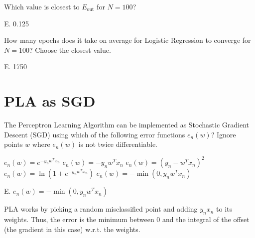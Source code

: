 \documentclass[answers]{exam}
\begin{document}
\begin{questions}
\setcounter{question}{7}

\question Which value is closest to \( E_{\text{out}} \) for \( N = 100 \)?

\begin{choices}
\end{choices}

\begin{solution}
E. 0.125
\end{solution}

\question How many epochs does it take on average for Logistic Regression to converge 
for \( N = 100 \)? Choose the closest value.

\begin{choices}
\end{choices}

\begin{solution}
E. 1750 
\end{solution}

\end{questions}

\section*{PLA as SGD}

\begin{questions}
\setcounter{question}{9}

\question The Perceptron Learning Algorithm can be implemented as Stochastic 
Gradient Descent (SGD) using which of the following error functions \( e_n(w) \)? 
Ignore points \( w \) where \( e_n(w) \) is not twice differentiable.

\begin{choices}
    \choice \( e_n(w) = e^{-y_n w^T x_n} \)
    \choice \( e_n(w) = -y_n w^T x_n \)
    \choice \( e_n(w) = (y_n - w^T x_n)^2 \)
    \choice \( e_n(w) = \ln(1 + e^{-y_n w^T x_n}) \)
    \choice \( e_n(w) = -\min(0, y_n w^T x_n) \)
\end{choices}

\begin{solution}
E. \( e_n(w) = -\min(0, y_n w^T x_n) \)

PLA works by picking a random misclassified point and adding $y_{n}x_{n}$
to its weights. Thus, the error is the minimum between 0 and the integral
of the offset (the gradient in this case) w.r.t. the weights.
\end{solution}

\end{questions}
\end{document}
